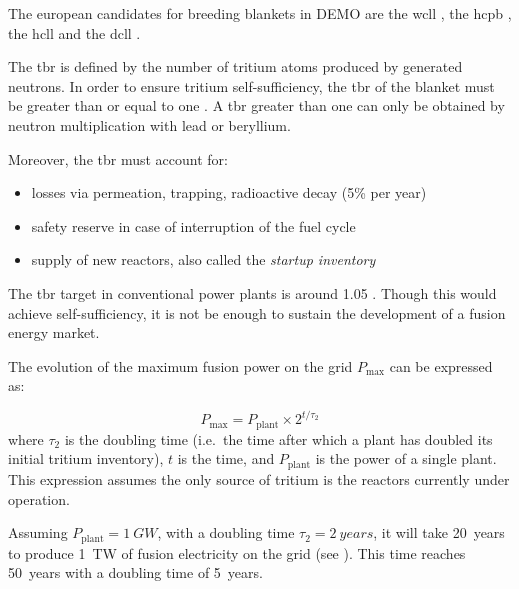 The european candidates for \glspl{breeding blanket} in DEMO are the \gls{wcll} , the \gls{hcpb} , the \gls{hcll}  and the \gls{dcll}  .

The \gls{tbr} is defined by the number of tritium atoms produced by generated neutrons.
In order to ensure tritium self-sufficiency, the \gls{tbr} of the blanket must be greater than or equal to one .
A \gls{tbr} greater than one can only be obtained by neutron multiplication with lead or beryllium.

Moreover, the \gls{tbr} must account for:
\begin{itemize}
    \item losses via \gls{permeation}, \gls{trapping}, radioactive decay (5\% per year)
    \item safety reserve in case of interruption of the fuel cycle
    \item supply of new reactors, also called the \emph{\gls{startup inventory}}
\end{itemize}

The \gls{tbr} target in conventional power plants is around 1.05 .
Though this would achieve self-sufficiency, it is not be enough to sustain the development of a fusion energy market.

The evolution of the maximum fusion power on the grid $P_\mathrm{max}$ can be expressed as:

\begin{equation}
    P_\mathrm{max} = P_\mathrm{plant} \times 2^{t/\tau_2}
\end{equation}
where $\tau_2$ is the doubling time (i.e.\ the time after which a plant has doubled its initial tritium \gls{inventory}), $t$ is the time, and $P_\mathrm{plant}$ is the power of a single plant.
This expression assumes the only source of tritium is the reactors currently under operation.

Assuming $P_\mathrm{plant} = \SI{1}{GW}$, with a doubling time $\tau_2 = \SI{2}{years}$, it will take \SI{20}{years} to produce \SI{1}{TW} of fusion electricity on the grid (see ).
This time reaches \SI{50}{years} with a doubling time of \SI{5}{years}.

